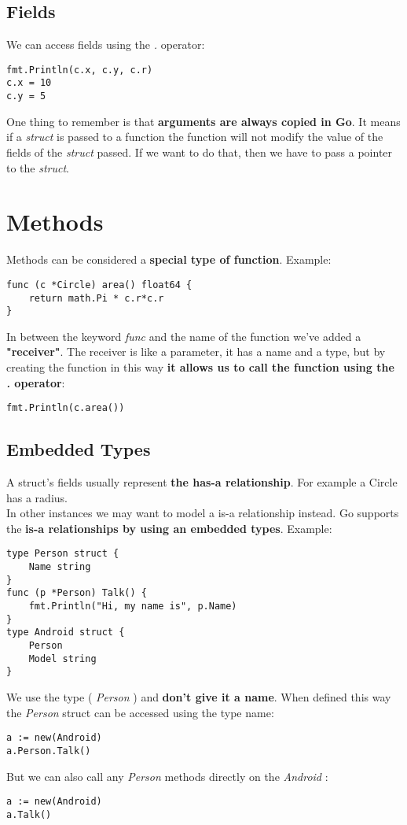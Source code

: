 \documentclass[10pt,letterpaper]{report}
\begin{document}
\subsection{Fields}
We can access fields using the \textit{.} operator:
\begin{lstlisting}
fmt.Println(c.x, c.y, c.r)
c.x = 10
c.y = 5
\end{lstlisting}
One thing to remember is that \textbf{arguments are always copied in Go}. It means if a \textit{struct} is passed to a function the function will not modify the value of the fields of the \textit{struct} passed. If we want to do that, then we have to pass a pointer to the \textit{struct}.
\section{Methods}
Methods can be considered a \textbf{special type of function}. Example:
\begin{lstlisting}
func (c *Circle) area() float64 {
	return math.Pi * c.r*c.r
}
\end{lstlisting}
In between the keyword \textit{func} and the name of the function we've added a \textbf{"receiver"}. The receiver is like a parameter, it has a name and a type, but by creating the function in this way \textbf{it allows us to call the function using the \textit{.} operator}:
\begin{lstlisting}
fmt.Println(c.area())
\end{lstlisting}
\subsection{Embedded Types}
A struct's fields usually represent \textbf{the has-a relationship}. For example a Circle has a radius.\\
In other instances we may want to model a is-a relationship instead. Go supports the \textbf{is-a relationships by using an embedded types}. Example:
\begin{lstlisting}
type Person struct {
	Name string
}
func (p *Person) Talk() {
	fmt.Println("Hi, my name is", p.Name)
}
type Android struct {
	Person
	Model string
}
\end{lstlisting}
We use the type ( \textit{Person} ) and \textbf{don't give it a name}. When defined this way the \textit{Person} struct can be accessed using the type name:
\begin{lstlisting}
a := new(Android)
a.Person.Talk()
\end{lstlisting}
But we can also call any \textit{Person} methods directly on the \textit{Android} :
\begin{lstlisting}
a := new(Android)
a.Talk()
\end{lstlisting}
\end{document}

